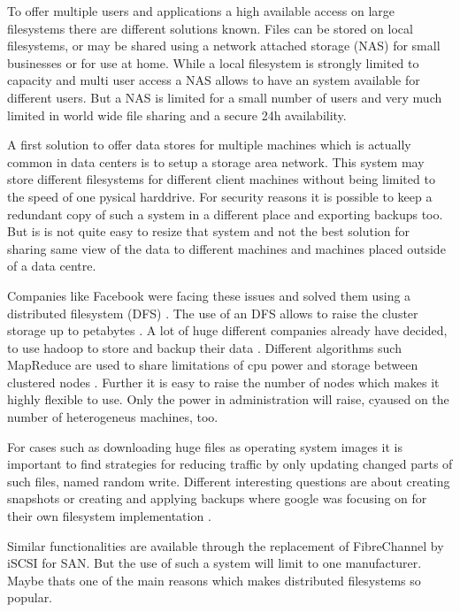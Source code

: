 To offer multiple users and applications a high available access on large filesystems there are different solutions known. 
Files can be stored on local filesystems, or may be shared using a network attached storage (NAS) for small businesses or for use at home. 
While a local filesystem is strongly limited to capacity and multi user access a NAS allows to have an system available for different users. 
But a NAS is limited for a small number of users and very much limited in world wide file sharing and a secure 24h availability.

A first solution to offer data stores for multiple machines which is actually common in data centers is to setup a storage area network. 
This system may store different filesystems for different client machines without being limited to the speed of one pysical harddrive. 
For security reasons it is possible to keep a redundant copy of such a system in a different place and exporting backups too. 
But is is not quite easy to resize that system and not the best solution for sharing same view of the data to different machines and machines placed outside of a data centre.

Companies like Facebook were facing these issues and solved them using a distributed filesystem (DFS) \cite{fb-hadoop}. 
The use of an DFS allows to raise the cluster storage  up to petabytes  \cite{fb-hadoop}. 
A lot of huge different companies already have decided, to use hadoop to store and backup their data  \cite{hadoop-poweredby}. 
Different algorithms such MapReduce are used to share limitations of cpu power and storage between clustered nodes \cite{dean2008mapreduce}. 
Further it is easy to raise the number of nodes which makes it highly flexible to use. Only the power in administration will raise, cyaused on the number of heterogeneus machines, too.

For cases such as downloading huge files as operating system images it is important to find strategies for reducing traffic by only updating changed parts of such files, named random write.
Different interesting questions are about creating snapshots or creating and applying backups where google was focusing on for their own filesystem implementation \cite{ghemawat2003google}.

Similar functionalities are available through the replacement of FibreChannel by iSCSI for SAN. But the use of such a system will limit to one manufacturer. Maybe thats one of the main reasons which makes distributed filesystems so popular.

